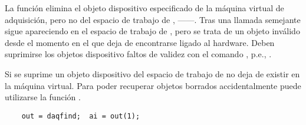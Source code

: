 La función  elimina el objeto dispositivo especificado de la máquina virtual de adquisición, pero no del espacio de trabajo de \matlab{}, ------. Tras una llamada semejante  sigue apareciendo en el espacio de trabajo de \matlab{}, pero se trata de un objeto inválido desde el momento en el que deja de encontrarse ligado al hardware. Deben suprimirse los objetos dispositivo faltos de validez con el comando , p.e., .\par
Si se suprime un objeto dispositivo del espacio de trabajo de \matlab{} no deja de existir en la máquina virtual. Para poder recuperar objetos borrados accidentalmente puede utilizarse la función .

\begin{lstlisting}
	out = daqfind;	ai = out(1);
\end{lstlisting}
